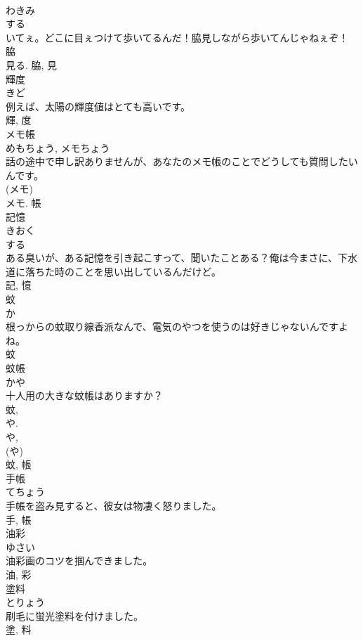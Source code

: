 \documentclass[8pt]{extreport}
\begin{document}
\begin{CJK}{UTF8}{min}
\\	わきみ	
\\	する 
\\	いてぇ。どこに目ぇつけて歩いてるんだ！脇見しながら歩いてんじゃねぇぞ！	
\\	脇 
\\	見る.	脇, 見	
\\	輝度	
\\	きど	
\\	例えば、太陽の輝度値はとても高いです。	
\\	輝, 度	
\\	メモ帳	
\\	めもちょう, メモちょう	
\\	話の途中で申し訳ありませんが、あなたのメモ帳のことでどうしても質問したいんです。	
\\	(メモ) 
\\	メモ.	帳	
\\	記憶	
\\	きおく	
\\	する 
\\	ある臭いが、ある記憶を引き起こすって、聞いたことある？俺は今まさに、下水道に落ちた時のことを思い出しているんだけど。	
\\	記, 憶	
\\	蚊	
\\	か	
\\	根っからの蚊取り線香派なんで、電気のやつを使うのは好きじゃないんですよね。	
\\	蚊	
\\	蚊帳	
\\	かや	
\\	十人用の大きな蚊帳はありますか？	
\\	蚊, 
\\	や. 
\\	や, 
\\	(や) 
\\	蚊, 帳	
\\	手帳	
\\	てちょう	
\\	手帳を盗み見すると、彼女は物凄く怒りました。	
\\	手, 帳	
\\	油彩	
\\	ゆさい	
\\	油彩画のコツを掴んできました。	
\\	油, 彩	
\\	塗料	
\\	とりょう	
\\	刷毛に蛍光塗料を付けました。	
\\	塗, 料	

\end{CJK}
\end{document}
